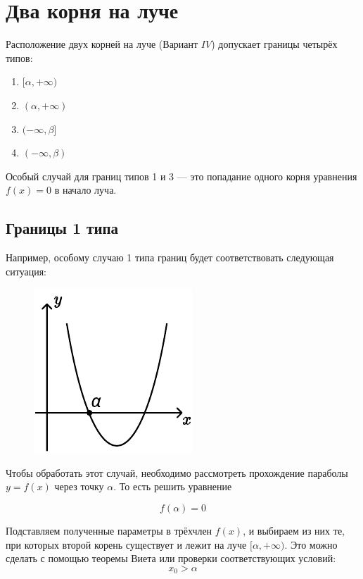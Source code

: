 \section {Два корня на луче}

Расположение двух корней на луче (Вариант $IV$) допускает границы четырёх типов:

\begin {enumerate} [labelindent=\parindent, leftmargin=*]
    \item {$[\alpha, +\infty)$}
    \item {$(\alpha, +\infty)$}
    \item {$(-\infty, \beta]$}
    \item {$(-\infty, \beta)$}
\end {enumerate}

Особый случай для границ типов 1 и 3 --- это попадание одного корня уравнения $f(x)=0$ в начало
луча.

\subsection {Границы 1 типа}

Например, особому случаю 1 типа границ будет соответствовать следующая ситуация:

\begin {figure} [h]
    \begin {minipage} [t] {\linewidth}
        \centering
        \includegraphics [width=0.3\linewidth] {images/image_10.pdf}
    \end {minipage}
\end {figure}

Чтобы обработать этот случай, необходимо рассмотреть прохождение параболы $y = f(x)$
через точку $\alpha$. То есть решить уравнение

$$ f(\alpha) = 0 $$

Подставляем полученные параметры в трёхчлен $f(x)$, и выбираем из них те, при которых второй корень
существует и лежит на луче $[\alpha, +\infty)$. Это можно
сделать с помощью теоремы Виета или проверки соответствующих условий:
\begin {equation*}
    x_0 > \alpha
\end {equation*}

